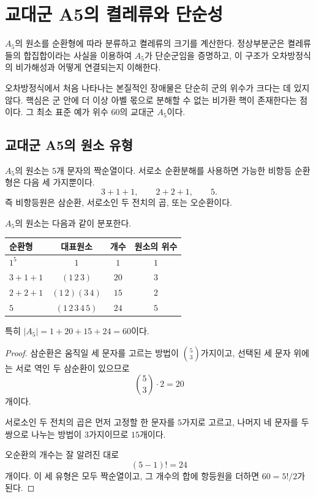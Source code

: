 \clearpage
\section{교대군 A5의 켤레류와 단순성}
\label{sec:a5-conjugacy-simplicity}

\begin{learninggoal}
$A_5$의 원소를 순환형에 따라 분류하고 켤레류의 크기를 계산한다. 정상부분군은 켤레류들의 합집합이라는 사실을 이용하여 $A_5$가 단순군임을 증명하고, 이 구조가 오차방정식의 비가해성과 어떻게 연결되는지 이해한다.
\end{learninggoal}

오차방정식에서 처음 나타나는 본질적인 장애물은 단순히 군의 위수가 크다는 데 있지 않다. 핵심은 군 안에 더 이상 아벨 몫으로 분해할 수 없는 비가환 핵이 존재한다는 점이다. 그 최소 표준 예가 위수 $60$의 교대군 $A_5$이다.

\subsection{교대군 A5의 원소 유형}

$A_5$의 원소는 $5$개 문자의 짝순열이다. 서로소 순환분해를 사용하면 가능한 비항등 순환형은 다음 세 가지뿐이다.
\[
  3+1+1,\qquad 2+2+1,\qquad 5.
\]
즉 비항등원은 삼순환, 서로소인 두 전치의 곱, 또는 오순환이다.

\begin{proposition}[$A_5$의 원소 개수]
\label{prop:a5-element-counts}
$A_5$의 원소는 다음과 같이 분포한다.
\begin{center}
\renewcommand{\arraystretch}{1.2}
\begin{tabular}{lccc}
\toprule
순환형 & 대표원소 & 개수 & 원소의 위수 \\
\midrule
$1^5$ & $1$ & $1$ & $1$ \\
$3+1+1$ & $(1\,2\,3)$ & $20$ & $3$ \\
$2+2+1$ & $(1\,2)(3\,4)$ & $15$ & $2$ \\
$5$ & $(1\,2\,3\,4\,5)$ & $24$ & $5$ \\
\bottomrule
\end{tabular}
\end{center}
특히 $|A_5|=1+20+15+24=60$이다.
\end{proposition}

\begin{proof}
삼순환은 움직일 세 문자를 고르는 방법이 $\binom53$가지이고, 선택된 세 문자 위에는 서로 역인 두 삼순환이 있으므로
\[
  \binom53\cdot2=20
\]
개이다.

서로소인 두 전치의 곱은 먼저 고정할 한 문자를 $5$가지로 고르고, 나머지 네 문자를 두 쌍으로 나누는 방법이 $3$가지이므로 $15$개이다.

오순환의 개수는 잘 알려진 대로
\[
  (5-1)!=24
\]
개이다. 이 세 유형은 모두 짝순열이고, 그 개수의 합에 항등원을 더하면 $60=5!/2$가 된다.
\end{proof}

